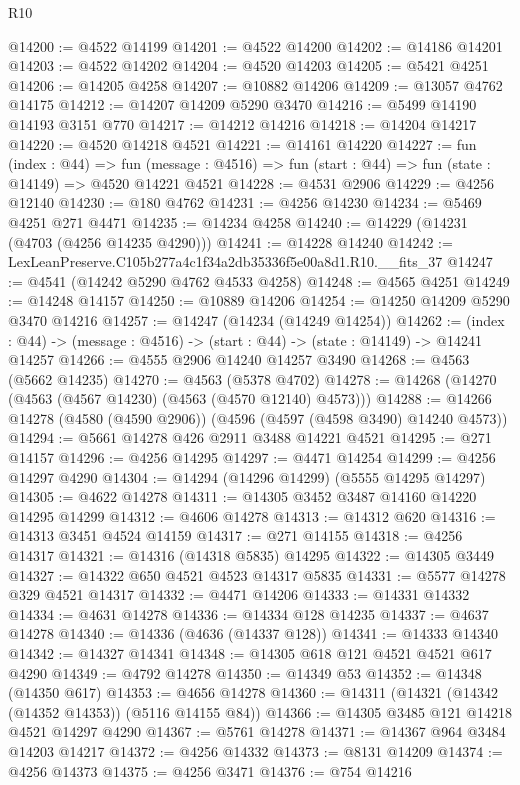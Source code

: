 \begin{lexlean}{R10}
\begin{coremodule}
@14200 := @4522 @14199
@14201 := @4522 @14200
@14202 := @14186 @14201
@14203 := @4522 @14202
@14204 := @4520 @14203
@14205 := @5421 @4251
@14206 := @14205 @4258
@14207 := @10882 @14206
@14209 := @13057 @4762 @14175
@14212 := @14207 @14209 @5290 @3470
@14216 := @5499 @14190 @14193 @3151 @770
@14217 := @14212 @14216
@14218 := @14204 @14217
@14220 := @4520 @14218 @4521
@14221 := @14161 @14220
@14227 := fun (index : @44) =>
  fun (message : @4516) => fun (start : @44) => fun (state : @14149) => @4520 @14221 @4521
@14228 := @4531 @2906
@14229 := @4256 @12140
@14230 := @180 @4762
@14231 := @4256 @14230
@14234 := @5469 @4251 @271 @4471
@14235 := @14234 @4258
@14240 := @14229 (@14231 (@4703 (@4256 @14235 @4290)))
@14241 := @14228 @14240
@14242 := LexLeanPreserve.C105b277a4c1f34a2db35336f5e00a8d1.R10.__fits_37
@14247 := @4541 (@14242 @5290 @4762 @4533 @4258)
@14248 := @4565 @4251
@14249 := @14248 @14157
@14250 := @10889 @14206
@14254 := @14250 @14209 @5290 @3470 @14216
@14257 := @14247 (@14234 (@14249 @14254))
@14262 := (index : @44) -> (message : @4516) -> (start : @44) -> (state : @14149) -> @14241 @14257
@14266 := @4555 @2906 @14240 @14257 @3490
@14268 := @4563 (@5662 @14235)
@14270 := @4563 (@5378 @4702)
@14278 := @14268 (@14270 (@4563 (@4567 @14230) (@4563 (@4570 @12140) @4573)))
@14288 := @14266 @14278 (@4580 (@4590 @2906)) (@4596 (@4597 (@4598 @3490) @14240 @4573))
@14294 := @5661 @14278 @426 @2911 @3488 @14221 @4521
@14295 := @271 @14157
@14296 := @4256 @14295
@14297 := @4471 @14254
@14299 := @4256 @14297 @4290
@14304 := @14294 (@14296 @14299) (@5555 @14295 @14297)
@14305 := @4622 @14278
@14311 := @14305 @3452 @3487 @14160 @14220 @14295 @14299
@14312 := @4606 @14278
@14313 := @14312 @620
@14316 := @14313 @3451 @4524 @14159
@14317 := @271 @14155
@14318 := @4256 @14317
@14321 := @14316 (@14318 @5835) @14295
@14322 := @14305 @3449
@14327 := @14322 @650 @4521 @4523 @14317 @5835
@14331 := @5577 @14278 @329 @4521 @14317
@14332 := @4471 @14206
@14333 := @14331 @14332
@14334 := @4631 @14278
@14336 := @14334 @128 @14235
@14337 := @4637 @14278
@14340 := @14336 (@4636 (@14337 @128))
@14341 := @14333 @14340
@14342 := @14327 @14341
@14348 := @14305 @618 @121 @4521 @4521 @617 @4290
@14349 := @4792 @14278
@14350 := @14349 @53
@14352 := @14348 (@14350 @617)
@14353 := @4656 @14278
@14360 := @14311 (@14321 (@14342 (@14352 @14353)) (@5116 @14155 @84))
@14366 := @14305 @3485 @121 @14218 @4521 @14297 @4290
@14367 := @5761 @14278
@14371 := @14367 @964 @3484 @14203 @14217
@14372 := @4256 @14332
@14373 := @8131 @14209
@14374 := @4256 @14373
@14375 := @4256 @3471
@14376 := @754 @14216

\end{coremodule}
\end{lexlean}
